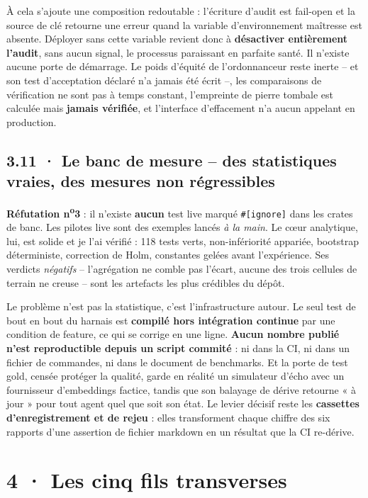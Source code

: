 \documentclass[10pt]{article}
\newcommand{\code}[1]{\texttt{\small #1}}
\begin{document}
À cela s'ajoute une composition redoutable : l'écriture d'audit est fail-open et la source de clé
retourne une erreur quand la variable d'environnement maîtresse est absente. Déployer sans cette
variable revient donc à \textbf{désactiver entièrement l'audit}, sans aucun signal, le processus
paraissant en parfaite santé. Il n'existe aucune porte de démarrage. Le poids d'équité de
l'ordonnanceur reste inerte -- et son test d'acceptation déclaré n'a jamais été écrit --, les
comparaisons de vérification ne sont pas à temps constant, l'empreinte de pierre tombale est calculée
mais \textbf{jamais vérifiée}, et l'interface d'effacement n'a aucun appelant en production.

\subsection{3.11 · Le banc de mesure -- des statistiques vraies, des mesures non régressibles}

\textbf{Réfutation n\textsuperscript{o}3} : il n'existe \textbf{aucun} test live marqué
\code{\#[ignore]} dans les crates de banc. Les pilotes live sont des exemples lancés \emph{à la main}.
Le c\oe{}ur analytique, lui, est solide et je l'ai vérifié : 118 tests verts, non-infériorité appariée,
bootstrap déterministe, correction de Holm, constantes gelées avant l'expérience. Ses verdicts
\emph{négatifs} -- l'agrégation ne comble pas l'écart, aucune des trois cellules de terrain ne creuse --
sont les artefacts les plus crédibles du dépôt.

Le problème n'est pas la statistique, c'est l'infrastructure autour. Le seul test de bout en bout du
harnais est \textbf{compilé hors intégration continue} par une condition de feature, ce qui se corrige
en une ligne. \textbf{Aucun nombre publié n'est reproductible depuis un script commité} : ni dans la
CI, ni dans un fichier de commandes, ni dans le document de benchmarks. Et la porte de test gold, censée
protéger la qualité, garde en réalité un simulateur d'écho avec un fournisseur d'embeddings factice,
tandis que son balayage de dérive retourne « à jour » pour tout agent quel que soit son état. Le levier
décisif reste les \textbf{cassettes d'enregistrement et de rejeu} : elles transforment chaque chiffre
des six rapports d'une assertion de fichier markdown en un résultat que la CI re-dérive.

\section{4 · Les cinq fils transverses}
\end{document}

